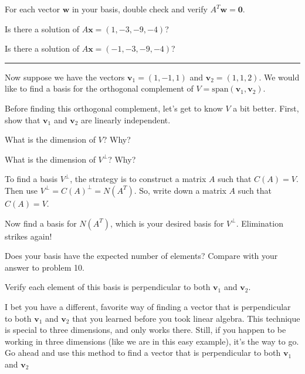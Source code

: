 \documentclass[minion]{homework}
\def\vv{\mathbf{v}}
\begin{document}
\begin{aproblems}
\aproblem For each vector $\mathbf w$ in your basis, double check 
and verify $A^T\mathbf w = \mathbf 0$.

\aproblem Is there a solution of $A\mathbf x = (1,-3,-9,-4)$?

\aproblem Is there a solution of $A\mathbf x = (-1,-3,-9,-4)$?
\vskip 10pt

\hrule 

Now suppose we have the vectors $\mathbf v_1 = (1,-1,1)$ and
$\mathbf v_2 = (1, 1, 2)$.  We would like to find 
a basis for the orthogonal complement of $V = \mathrm{span}(\vv_1,\vv_2)$.


\aproblem 
Before finding this orthogonal complement, let's get to know $V$
a bit better. First, show that $\vv_1$ and $\vv_2$ are linearly independent.

\aproblem What is the dimension of $V$? Why?

\aproblem What is the dimension of $V^\perp$? Why?

\aproblem To find a basis $V^\perp$, the strategy is to construct
a matrix $A$ such that $C(A)=V$.  Then use $V^\perp = C(A)^\perp = N(A^T)$.
So, write down a matrix $A$ such that $C(A)=V$.

\aproblem Now find a basis for $N(A^T)$, which is your desired basis for $V^\perp$.  Elimination strikes again!

\aproblem Does your basis have the expected number of elements? Compare with
your answer to problem 10.

\aproblem Verify each element of this basis is perpendicular
to both $\vv_1$ and $\vv_2$.

\aproblem I bet you have a different, favorite way of finding a vector
that is perpendicular to both $\vv_1$ and $\vv_2$ that you learned 
before you took linear algebra.  This technique is special to three dimensions, and only works there. Still, if you happen to be working
in three dimensions (like we are in this easy example), it's the way to go.
Go ahead and use this method to find a vector that
is perpendicular to both $\vv_1$ and $\vv_2$

\end{aproblems}
\end{document}
